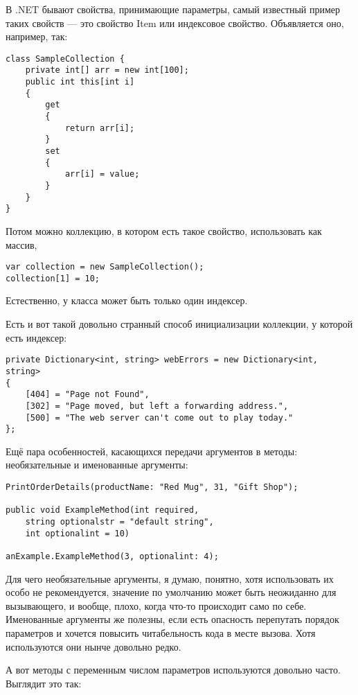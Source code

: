 \documentclass[a5paper]{article}
\begin{document}
В .NET бывают свойства, принимающие параметры, самый известный пример таких свойств --- это свойство Item или индексовое свойство. Объявляется оно, например, так: 

\begin{verbatim}
class SampleCollection {
    private int[] arr = new int[100];
    public int this[int i]
    {
        get
        {
            return arr[i];
        }
        set
        {
            arr[i] = value;
        }
    }
}
\end{verbatim}

Потом можно коллекцию, в котором есть такое свойство, использовать как массив,

\begin{verbatim}
var collection = new SampleCollection();
collection[1] = 10;
\end{verbatim}

Естественно, у класса может быть только один индексер.

Есть и вот такой довольно странный способ инициализации коллекции, у которой есть индексер:

\begin{verbatim}
private Dictionary<int, string> webErrors = new Dictionary<int, string>
{
    [404] = "Page not Found",
    [302] = "Page moved, but left a forwarding address.",
    [500] = "The web server can't come out to play today."
};
\end{verbatim}

Ещё пара особенностей, касающихся передачи аргументов в методы: необязательные и именованные аргументы:

\begin{verbatim}
PrintOrderDetails(productName: "Red Mug", 31, "Gift Shop");

public void ExampleMethod(int required, 
    string optionalstr = "default string",
    int optionalint = 10)

anExample.ExampleMethod(3, optionalint: 4);
\end{verbatim}

Для чего необязательные аргументы, я думаю, понятно, хотя использовать их особо не рекомендуется, значение по умолчанию может быть неожиданно для вызывающего, и вообще, плохо, когда что-то происходит само по себе. Именованные аргументы же полезны, если есть опасность перепутать порядок параметров и хочется повысить читабельность кода в месте вызова. Хотя используются они нынче довольно редко.

А вот методы с переменным числом параметров используются довольно часто. Выглядит это так:
\end{document}
